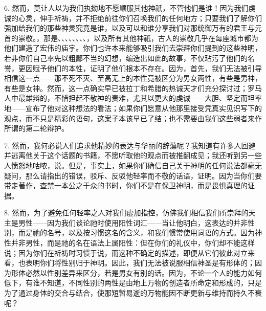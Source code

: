 6. 然而，莫让人以为我们执拗地不愿顺服其他神祇，不管他们是谁！因为我们虔诚的心灵，伸手祈祷，并不拒绝前往你们召唤我们的任何地方；只要我们了解你们强加给我们的那些神灵究竟是谁，以及可以和谁分享我们对那统御万有的君王与元首的崇敬。，那是、、、、、、、、，以及所有其他神祇，古人的崇敬几乎在每座城市都为他们建造了宏伟的庙宇。你们也许本来能够吸引我们去崇拜你们提到的这些神明，若非你们自己率先以粗鄙不当的幻想，编造出如此的故事，不仅玷污了他们的名誉，更因赋予他们的本性，证明了他们根本不存在。因为，首先，我们无法被引导相信这一点——那不死不灭、至高无上的本性竟被区分为男女两性，有些是男神，有些是女神。然而，这一点确实早已被拉丁和希腊的热诚天才们充分探讨过；罗马人中最雄辩的，不惜担起不敬神的责难，尤其以更大的虔诚——大胆、坚定而坦率地——宣布了他对这种想法的看法；如果你们愿意从他那里接受凭真实见识写下的观点，而不只是精彩的语句，这案子本该早已了结；也不需要由我们这些弱者来作所谓的第二轮辩护。\par

7. 然而，我何必说人们追求他精妙的表达与华丽的辞藻呢？我知道有许多人回避并逃离他关于这个话题的书籍，不愿听取他的观点而被推翻成见；我还听到另一些人愤怒地咕哝，说。但是，事实上，如果你们确信自己关于神明的任何说法都毫无疑问，那么请指出的错误，驳斥、反驳他轻率而不敬的话语，证明。因为当你们要带走著作，查禁一本公之于众的书时，你们不是在保卫神明，而是畏惧真理的证据。\par

8. 然而，为了避免任何轻率之人对我们虚加指控，仿佛我们相信我们所崇拜的天主是男性——因为我们谈论祂时使用阳性词汇——当让他明白，这表达的并非性别，而是祂的名号，以及按习惯这名的含义，和我们惯常使用词语的方式。因为神性并非男性，而是祂的名在语法上属阳性：但在你们的礼仪中，你们却不能这样说；因为你们在祈祷时习惯于说，而这种不确定的描述，即便从它们彼此对立来看，也表明你们将性别归于神明。因此，我们无法被说服相信神圣是有形体的；因为形体必然以性别差异来区分，若是男女有别的话。因为，不论一个人的能力如何低下，有谁不知道，不同性别的两性是由地上万物的创造者所命定和形成的，只是为了通过身体的交合与结合，使那短暂易逝的万物能因不断更新与维持而持久不衰呢？\par

